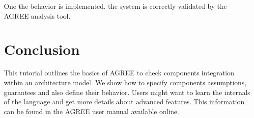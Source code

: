\documentclass[times, 10pt]{article}
\begin{document}
    One the behavior is implemented, the system is correctly validated by the
    AGREE analysis tool.

    \section{Conclusion}
    This tutorial outlines the basics of AGREE to check components integration
    within an architecture model. We show how to specify components
    assumptions, guarantees and also define their behavior. Users might want to
    learn the internals of the language and get more details about advanced
    features. This information can be found in the AGREE user manual available
    online.
\end{document}
